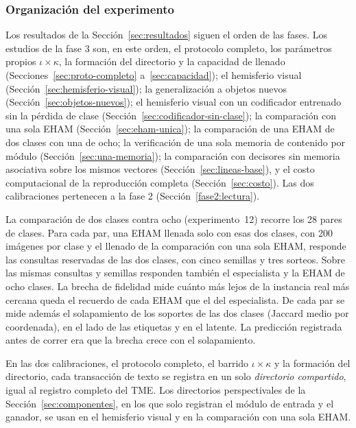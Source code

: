 \subsubsection{Organización del experimento}
\label{sec:organizacion}

Los resultados de la Sección~\ref{sec:resultados} siguen el orden de las fases.
Los estudios de la fase 3 son, en este orden, el protocolo completo, los parámetros
propios $\iota \times \kappa$, la formación del directorio y la capacidad de llenado
(Secciones~\ref{sec:proto-completo} a~\ref{sec:capacidad}); el hemisferio visual
(Sección~\ref{sec:hemisferio-visual}); la generalización a objetos nuevos
(Sección~\ref{sec:objetos-nuevos}); el hemisferio visual con un codificador entrenado
sin la pérdida de clase (Sección~\ref{sec:codificador-sin-clase}); la comparación con
una sola EHAM (Sección~\ref{sec:eham-unica}); la comparación de una EHAM de dos clases
con una de ocho; la verificación de una sola memoria de contenido por módulo
(Sección~\ref{sec:una-memoria}); la comparación con decisores sin memoria asociativa
sobre los mismos vectores (Sección~\ref{sec:lineas-base}), y el costo computacional de
la reproducción completa (Sección~\ref{sec:costo}).
Las dos calibraciones pertenecen a la fase 2 (Sección~\ref{fase2:lectura}).

La comparación de dos clases contra ocho (experimento~12) recorre los 28 pares de
clases.
Para cada par, una EHAM llenada solo con esas dos clases, con 200 imágenes por clase y
el llenado de la comparación con una sola EHAM, responde las consultas reservadas de
las dos clases, con cinco semillas y tres sorteos.
Sobre las mismas consultas y semillas responden también el especialista y la EHAM de
ocho clases.
La brecha de fidelidad mide cuánto más lejos de la instancia real más cercana queda el
recuerdo de cada EHAM que el del especialista.
De cada par se mide además el solapamiento de los soportes de las dos clases (Jaccard
medio por coordenada), en el lado de las etiquetas y en el latente.
La predicción registrada antes de correr era que la brecha crece con el solapamiento.

En las dos calibraciones, el protocolo completo, el barrido $\iota \times \kappa$ y la
formación del directorio, cada transacción de texto se registra en un solo
\emph{directorio compartido}, igual al registro completo del TME.
Los directorios perspectivales de la Sección~\ref{sec:componentes}, en los que solo
registran el módulo de entrada y el ganador, se usan en el hemisferio visual y en la
comparación con una sola EHAM.

